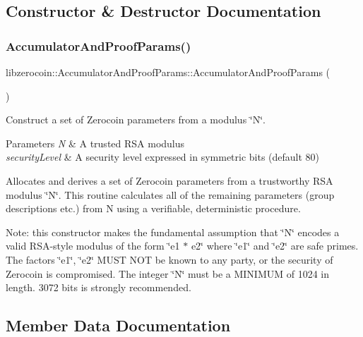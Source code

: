 \subsection{Constructor \& Destructor Documentation}
\mbox{\label{classlibzerocoin_1_1_accumulator_and_proof_params_ad5e69167694e5614940d89f3d1c5fbc5}} 
\subsubsection{\texorpdfstring{AccumulatorAndProofParams()}{AccumulatorAndProofParams()}}
{\footnotesize\ttfamily libzerocoin\+::\+Accumulator\+And\+Proof\+Params\+::\+Accumulator\+And\+Proof\+Params (\begin{DoxyParamCaption}{ }\end{DoxyParamCaption})}



Construct a set of Zerocoin parameters from a modulus \char`\"{}\+N\char`\"{}. 


\begin{DoxyParams}{Parameters}
{\em N} & A trusted R\+SA modulus \\
\hline
{\em security\+Level} & A security level expressed in symmetric bits (default 80)\\
\hline
\end{DoxyParams}
Allocates and derives a set of Zerocoin parameters from a trustworthy R\+SA modulus \char`\"{}\+N\char`\"{}. This routine calculates all of the remaining parameters (group descriptions etc.) from N using a verifiable, deterministic procedure.

Note\+: this constructor makes the fundamental assumption that \char`\"{}\+N\char`\"{} encodes a valid R\+S\+A-\/style modulus of the form \char`\"{}e1 $\ast$ e2\char`\"{} where \char`\"{}e1\char`\"{} and \char`\"{}e2\char`\"{} are safe primes. The factors \char`\"{}e1\char`\"{}, \char`\"{}e2\char`\"{} M\+U\+ST N\+OT be known to any party, or the security of Zerocoin is compromised. The integer \char`\"{}\+N\char`\"{} must be a M\+I\+N\+I\+M\+UM of 1024 in length. 3072 bits is strongly recommended. 

\subsection{Member Data Documentation}
\mbox{\label{classlibzerocoin_1_1_accumulator_and_proof_params_ace45005b583f557602be09cf1fbc9472}} 
